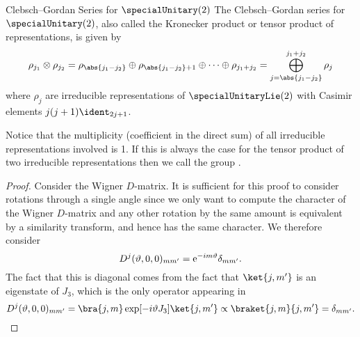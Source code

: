 \begin{thm}{Clebsch--Gordan Series for \(\specialUnitary(2)\)}{}
    The Clebsch--Gordan series for \(\specialUnitary(2)\), also called the Kronecker product or tensor product of representations, is given by
    \begin{equation}
        \rho_{j_1} \directproduct \rho_{j_2} = \rho_{\abs{j_1 - j_2}} \directsum \rho_{\abs{j_1 - j_2} + 1} \directsum \dotsb \directsum \rho_{j_1 + j_2} = \bigoplus_{j = \abs{j_1 - j_2}}^{j_1 + j_2} \rho_j
    \end{equation}
    where \(\rho_{j}\) are irreducible representations of \(\specialUnitaryLie(2)\) with Casimir elements \(j(j + 1)\ident_{2j + 1}\).
    \begin{rmk}
        Notice that the multiplicity (coefficient in the direct sum) of all irreducible representations involved is 1.
        If this is always the case for the tensor product of two irreducible representations then we call the group .
    \end{rmk}
    \begin{proof}
        Consider the Wigner \(D\)-matrix.
        It is sufficient for this proof to consider rotations through a single angle since we only want to compute the character of the Wigner \(D\)-matrix and any other rotation by the same amount is equivalent by a similarity transform, and hence has the same character.
        We therefore consider
        \begin{equation}
            D^j(\vartheta, 0, 0)_{mm'} = \mathrm{e}^{-im\vartheta}\delta_{mm'}.
        \end{equation}
        The fact that this is diagonal comes from the fact that \(\ket{j, m'}\) is an eigenstate of \(J_3\), which is the only operator appearing in
        \begin{equation}
            D^j(\vartheta, 0, 0)_{mm'} = \bra{j, m} \exp[-i\vartheta J_3]\ket{j, m'} \propto \braket{j, m}{j, m'} = \delta_{mm'}.
        \end{equation}
        

\end{proof}
\end{thm}
